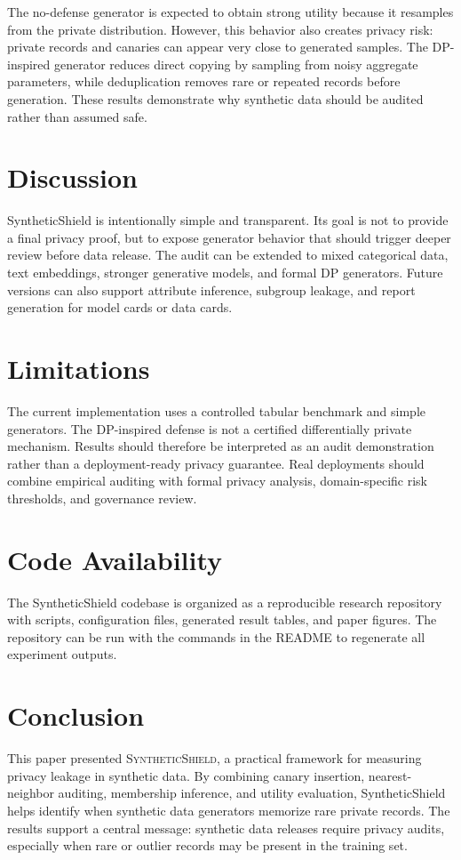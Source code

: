 \documentclass[10pt,twocolumn]{article}
\begin{document}
The no-defense generator is expected to obtain strong utility because it resamples from the private distribution. However, this behavior also creates privacy risk: private records and canaries can appear very close to generated samples. The DP-inspired generator reduces direct copying by sampling from noisy aggregate parameters, while deduplication removes rare or repeated records before generation. These results demonstrate why synthetic data should be audited rather than assumed safe.

\section{Discussion}
SyntheticShield is intentionally simple and transparent. Its goal is not to provide a final privacy proof, but to expose generator behavior that should trigger deeper review before data release. The audit can be extended to mixed categorical data, text embeddings, stronger generative models, and formal DP generators. Future versions can also support attribute inference, subgroup leakage, and report generation for model cards or data cards.

\section{Limitations}
The current implementation uses a controlled tabular benchmark and simple generators. The DP-inspired defense is not a certified differentially private mechanism. Results should therefore be interpreted as an audit demonstration rather than a deployment-ready privacy guarantee. Real deployments should combine empirical auditing with formal privacy analysis, domain-specific risk thresholds, and governance review.

\section{Code Availability}
The SyntheticShield codebase is organized as a reproducible research repository with scripts, configuration files, generated result tables, and paper figures. The repository can be run with the commands in the README to regenerate all experiment outputs.

\section{Conclusion}
This paper presented \textsc{SyntheticShield}, a practical framework for measuring privacy leakage in synthetic data. By combining canary insertion, nearest-neighbor auditing, membership inference, and utility evaluation, SyntheticShield helps identify when synthetic data generators memorize rare private records. The results support a central message: synthetic data releases require privacy audits, especially when rare or outlier records may be present in the training set.



\end{document}
